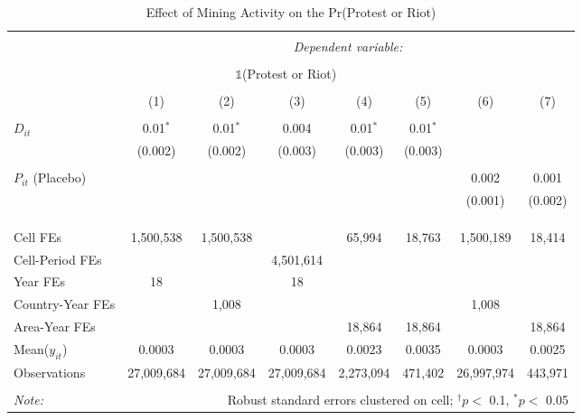 
\begin{table}[ht!] \centering 
  \caption{Effect of Mining Activity on the Pr(Protest or Riot)} 
  \label{tab:did_acled} 
\begin{tabular}{@{\extracolsep{0pt}}lccccccc} 
\\[-1.8ex]\hline 
\hline \\[-1.8ex] 
 & \multicolumn{7}{c}{\textit{Dependent variable:}} \\ 
\cline{2-8} 
\\[-1.8ex] & \multicolumn{5}{c}{$\mathbb{1}$(Protest or Riot)} & \multicolumn{2}{c}{} \\ 
\\[-1.8ex] & (1) & (2) & (3) & (4) & (5) & (6) & (7)\\ 
\hline \\[-1.8ex] 
 $D_{it}$ & 0.01$^{*}$ & 0.01$^{*}$ & 0.004 & 0.01$^{*}$ & 0.01$^{*}$ &  &  \\ 
  & (0.002) & (0.002) & (0.003) & (0.003) & (0.003) &  &  \\ 
  & & & & & & & \\ 
 $P_{it}$ (Placebo) &  &  &  &  &  & 0.002 & 0.001 \\ 
  &  &  &  &  &  & (0.001) & (0.002) \\ 
  & & & & & & & \\ 
\hline \\[-1.8ex] 
\hline \\[-1.8ex] Cell FEs & 1,500,538 & 1,500,538 &  & 65,994 & 18,763 & 1,500,189 & 18,414 \\ 
Cell-Period FEs &  &  & 4,501,614 &  &  &  &  \\ 
Year FEs & 18 &  & 18 &  &  &  &  \\ 
Country-Year FEs &  & 1,008 &  &  &  & 1,008 &  \\ 
Area-Year FEs &  &  &  & 18,864 & 18,864 &  & 18,864 \\ 
Mean($y_{it}$) & 0.0003 & 0.0003 & 0.0003 & 0.0023 & 0.0035 & 0.0003 & 0.0025 \\ 
Observations & 27,009,684 & 27,009,684 & 27,009,684 & 2,273,094 & 471,402 & 26,997,974 & 443,971 \\ 
\hline 
\hline \\[-1.8ex] 
\textit{Note:}  & \multicolumn{7}{r}{Robust standard errors clustered on cell; $^{\dagger} p <$ 0.1, $^*p <$ 0.05} \\ 
\end{tabular} 
\end{table} 
